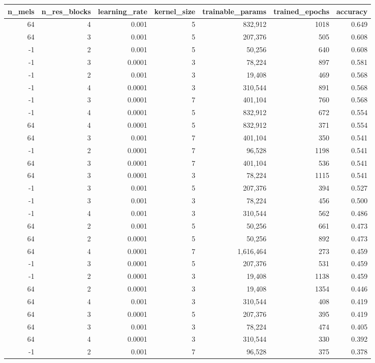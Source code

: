 \begin{tabular}{rrrrrrr}
\toprule
\textbf{n\_mels} & \textbf{n\_res\_blocks} & \textbf{learning\_rate} & \textbf{kernel\_size}& \textbf{trainable\_params} & \textbf{trained\_epochs} & \textbf{accuracy} \\
\midrule
64 & 4 & 0.001 & 5 & 832,912 & 1018 & 0.649 \\
64 & 3 & 0.001 & 5 & 207,376 & 505 & 0.608 \\
-1 & 2 & 0.001 & 5 & 50,256 & 640 & 0.608 \\
-1 & 3 & 0.0001 & 3 & 78,224 & 897 & 0.581 \\
-1 & 2 & 0.001 & 3 & 19,408 & 469 & 0.568 \\
-1 & 4 & 0.0001 & 3 & 310,544 & 891 & 0.568 \\
-1 & 3 & 0.0001 & 7 & 401,104 & 760 & 0.568 \\
-1 & 4 & 0.0001 & 5 & 832,912 & 672 & 0.554 \\
64 & 4 & 0.0001 & 5 & 832,912 & 371 & 0.554 \\
64 & 3 & 0.001 & 7 & 401,104 & 350 & 0.541 \\
-1 & 2 & 0.0001 & 7 & 96,528 & 1198 & 0.541 \\
64 & 3 & 0.0001 & 7 & 401,104 & 536 & 0.541 \\
64 & 3 & 0.0001 & 3 & 78,224 & 1115 & 0.541 \\
-1 & 3 & 0.001 & 5 & 207,376 & 394 & 0.527 \\
-1 & 3 & 0.001 & 3 & 78,224 & 456 & 0.500 \\
-1 & 4 & 0.001 & 3 & 310,544 & 562 & 0.486 \\
64 & 2 & 0.001 & 5 & 50,256 & 661 & 0.473 \\
64 & 2 & 0.0001 & 5 & 50,256 & 892 & 0.473 \\
64 & 4 & 0.0001 & 7 & 1,616,464 & 273 & 0.459 \\
-1 & 3 & 0.0001 & 5 & 207,376 & 531 & 0.459 \\
-1 & 2 & 0.0001 & 3 & 19,408 & 1138 & 0.459 \\
64 & 2 & 0.0001 & 3 & 19,408 & 1354 & 0.446 \\
64 & 4 & 0.001 & 3 & 310,544 & 408 & 0.419 \\
64 & 3 & 0.0001 & 5 & 207,376 & 395 & 0.419 \\
64 & 3 & 0.001 & 3 & 78,224 & 474 & 0.405 \\
64 & 4 & 0.0001 & 3 & 310,544 & 330 & 0.392 \\
-1 & 2 & 0.001 & 7 & 96,528 & 375 & 0.378 \\

\end{tabular}
